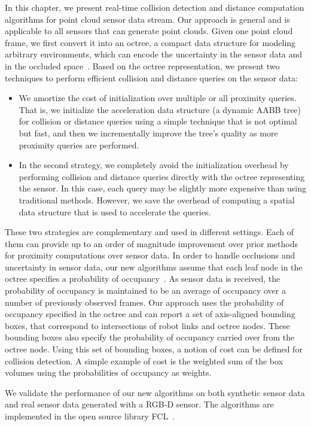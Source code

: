 In this chapter, we present real-time collision detection and distance
computation algorithms for point cloud sensor data stream.  Our approach is
general and is applicable to all sensors that can generate point clouds.
Given one point cloud frame, we first convert it into an octree, a
compact data structure for modeling arbitrary environments, which can encode
the uncertainty in the sensor data and in the occluded
space~\cite{octomap}. Based on the octree representation, we present
two techniques to perform efficient collision and distance queries on
the sensor data:
\begin{itemize}
\item We amortize the cost of initialization over multiple or all
  proximity queries. That is, we initialize the acceleration data structure (a dynamic AABB tree) for
  collision or distance queries using a simple technique
  that is not optimal but fast, and then we incrementally improve the tree's quality as more proximity queries are performed.
\item In the second strategy, we completely avoid the initialization
  overhead by performing collision and distance queries directly with
  the octree representing the sensor. In this case, each query
  may be slightly more expensive than using traditional methods. However, we save the overhead of computing a spatial data structure that is used to accelerate the queries.
\end{itemize}

These two strategies are complementary and used in different settings. Each of them can provide up to an order of magnitude improvement over prior methods for proximity computations over sensor data. In order to handle occlusions and uncertainty in sensor data, our new algorithms assume that each leaf
node in the octree specifies a probability of
occupancy~\cite{octomap}. As sensor data is received, the probability of
occupancy is maintained to be an average of occupancy over a number of
previously observed frames. Our
approach uses the probability of occupancy specified in the octree and
can report a set of axis-aligned bounding boxes, that
correspond to intersections of robot links and octree nodes. These
bounding boxes also specify the probability of occupancy carried over
from the octree node. Using this set of bounding boxes, a notion of
cost can be defined for collision detection. A simple example of cost is the
weighted sum of the box volumes using the probabilities of occupancy
as weights.

We validate the performance of our new algorithms on both synthetic
sensor data and real sensor data generated with a RGB-D sensor.
The algorithms are implemented in the open source library
FCL~\cite{Pan:ICRA:2012}.

